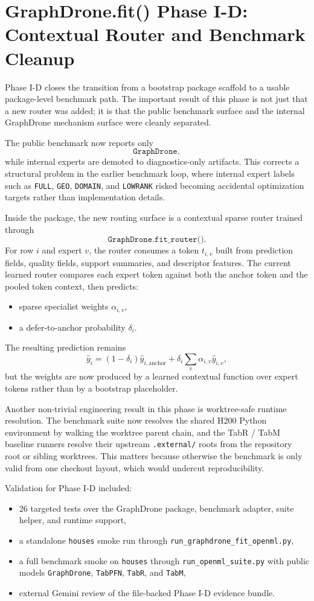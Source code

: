 \section{GraphDrone.fit() Phase I-D: Contextual Router and Benchmark Cleanup}

Phase I-D closes the transition from a bootstrap package scaffold to a usable package-level benchmark path. The important result of this phase is not just that a new router was added; it is that the public benchmark surface and the internal GraphDrone mechanism surface were cleanly separated.

The public benchmark now reports only
\[
\texttt{GraphDrone},
\]
while internal experts are demoted to diagnostics-only artifacts. This corrects a structural problem in the earlier benchmark loop, where internal expert labels such as \texttt{FULL}, \texttt{GEO}, \texttt{DOMAIN}, and \texttt{LOWRANK} risked becoming accidental optimization targets rather than implementation details.

Inside the package, the new routing surface is a contextual sparse router trained through
\[
\texttt{GraphDrone.fit\_router()}.
\]
For row \(i\) and expert \(v\), the router consumes a token \(t_{i,v}\) built from prediction fields, quality fields, support summaries, and descriptor features. The current learned router compares each expert token against both the anchor token and the pooled token context, then predicts:
\begin{itemize}
\item sparse specialist weights \(\alpha_{i,v}\),
\item a defer-to-anchor probability \(\delta_i\).
\end{itemize}
The resulting prediction remains
\[
\hat y_i = (1-\delta_i)\hat y_{i,\mathrm{anchor}} + \delta_i \sum_v \alpha_{i,v}\hat y_{i,v},
\]
but the weights are now produced by a learned contextual function over expert tokens rather than by a bootstrap placeholder.

Another non-trivial engineering result in this phase is worktree-safe runtime resolution. The benchmark suite now resolves the shared H200 Python environment by walking the worktree parent chain, and the TabR / TabM baseline runners resolve their upstream \texttt{.external/} roots from the repository root or sibling worktrees. This matters because otherwise the benchmark is only valid from one checkout layout, which would undercut reproducibility.

Validation for Phase I-D included:
\begin{itemize}
\item 26 targeted tests over the GraphDrone package, benchmark adapter, suite helper, and runtime support,
\item a standalone \texttt{houses} smoke run through \texttt{run\_graphdrone\_fit\_openml.py},
\item a full benchmark smoke on \texttt{houses} through \texttt{run\_openml\_suite.py} with public models \texttt{GraphDrone}, \texttt{TabPFN}, \texttt{TabR}, and \texttt{TabM},
\item external Gemini review of the file-backed Phase I-D evidence bundle.
\end{itemize}

